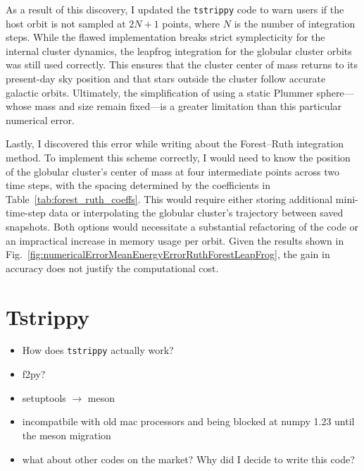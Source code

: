         As a result of this discovery, I updated the \texttt{tstrippy} code to warn users if the host orbit is not sampled at $2N + 1$ points, where $N$ is the number of integration steps. While the flawed implementation breaks strict symplecticity for the internal cluster dynamics, the leapfrog integration for the globular cluster orbits was still used correctly. This ensures that the cluster center of mass returns to its present-day sky position and that stars outside the cluster follow accurate galactic orbits. Ultimately, the simplification of using a static Plummer sphere—whose mass and size remain fixed—is a greater limitation than this particular numerical error.

        Lastly, I discovered this error while writing about the Forest–Ruth integration method. To implement this scheme correctly, I would need to know the position of the globular cluster’s center of mass at four intermediate points across two time steps, with the spacing determined by the coefficients in Table~\ref{tab:forest_ruth_coeffs}. This would require either storing additional mini-time-step data or interpolating the globular cluster's trajectory between saved snapshots. Both options would necessitate a substantial refactoring of the code or an impractical increase in memory usage per orbit. Given the results shown in Fig.~\ref{fig:numericalErrorMeanEnergyErrorRuthForestLeapFrog}, the gain in accuracy does not justify the computational cost.




\section{Tstrippy}

    \begin{itemize}
        \item How does \texttt{tstrippy} actually work?
        \item f2py? 
        \item setuptools $\rightarrow$ meson 
        \item incompatbile with old mac processors and being blocked at numpy 1.23 until the meson migration 
        \item what about other codes on the market? Why did I decide to write this code? 
    \end{itemize}

